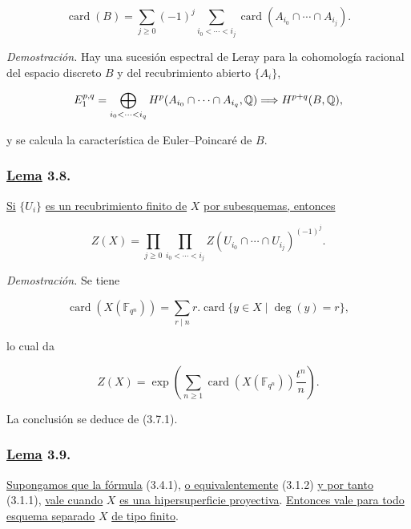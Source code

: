 \begin{equation}\tag{3.7.1}
\operatorname{card}(B)=
\sum_{j\geq0}(-1)^j
\sum_{i_0<\cdots<i_j}
\operatorname{card}(A_{i_0}\cap\cdots\cap A_{i_j}).
\end{equation}

\medskip
\noindent\emph{Demostración.}
Hay una sucesión espectral de Leray para la cohomología racional del
espacio discreto $B$ y del recubrimiento abierto $\{A_i\}$,

\[
E_1^{p,q}=\sisi{\bigoplus_q}{\bigoplus_{i_0<\cdots<i_q}}
H^p(A_{i_0}\cap\cdots\cap A_{i_q},\mathbb Q)
\Longrightarrow H^{p+q}(B,\mathbb Q),
\]

y se calcula la característica de Euler--Poincaré de $B$.

\subsubsection*{\underline{Lema} 3.8.}
\underline{Si} $\{U_i\}$ \underline{es un recubrimiento finito de} $X$ \underline{por subesquemas, entonces}

\begin{equation}\tag{3.8.1}
Z(X)=
\prod_{j\geq0}
\prod_{i_0<\cdots<i_j}
Z(U_{i_0}\cap\cdots\cap U_{i_j})^{(-1)^j}.
\end{equation}

\medskip
\noindent\emph{Demostración.}
Se tiene

\begin{equation}\tag{3.8.2}
\operatorname{card}(X(\mathbb F_{q^n}))
=\sum_{r\mid n}r.\operatorname{card}\{y\in X\mid\deg(y)=r\},
\end{equation}

lo cual da

\begin{equation}\tag{3.8.3}
Z(X)=\exp\!\left(
\sum_{n\geq1}\operatorname{card}(X(\mathbb F_{q^n}))\frac{t^n}{n}
\right).
\end{equation}

La conclusión se deduce de (3.7.1).

\subsubsection*{\underline{Lema} 3.9.}
\underline{Supongamos que la fórmula} (3.4.1), \underline{o equivalentemente} (3.1.2) \underline{y por tanto}
(3.1.1), \underline{vale cuando} $X$ \underline{es una hipersuperficie proyectiva}. \underline{Entonces vale
para todo esquema separado} $X$ \underline{de tipo finito}.

